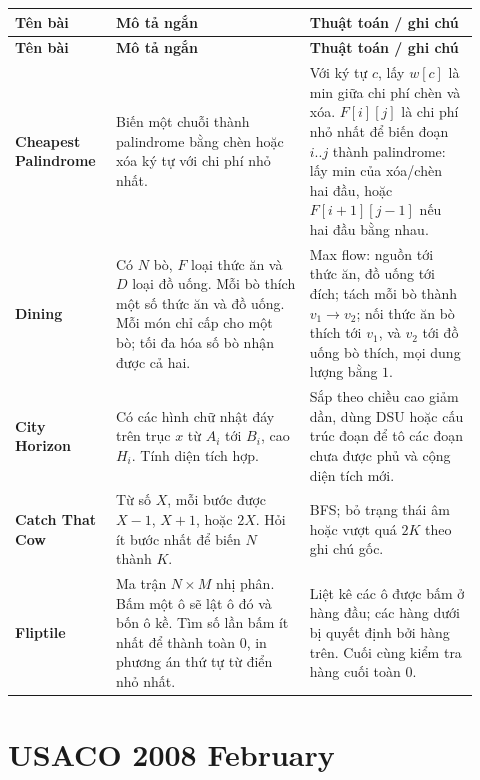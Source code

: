 \documentclass[11pt]{article}
\newenvironment{solutiontable}{%
  \small
  \setlength{\tabcolsep}{4pt}
  \renewcommand{\arraystretch}{1.14}
  \begin{longtable}{L{0.19\linewidth}L{0.39\linewidth}L{0.34\linewidth}}
  \toprule
  \textbf{Tên bài} & \textbf{Mô tả ngắn} & \textbf{Thuật toán / ghi chú}\\
  \midrule
  \endfirsthead
  \toprule
  \textbf{Tên bài} & \textbf{Mô tả ngắn} & \textbf{Thuật toán / ghi chú}\\
  \midrule
  \endhead
}{%
  \bottomrule
  \end{longtable}
  \normalsize
}
\newcommand{\problemrow}[3]{\textbf{#1} & #2 & #3\\\midrule}
\begin{document}
\begin{solutiontable}
\problemrow{Cheapest Palindrome}{Biến một chuỗi thành palindrome bằng chèn hoặc xóa ký tự với chi phí nhỏ nhất.}{Với ký tự \(c\), lấy \(w[c]\) là min giữa chi phí chèn và xóa. \(F[i][j]\) là chi phí nhỏ nhất để biến đoạn \(i..j\) thành palindrome: lấy min của xóa/chèn hai đầu, hoặc \(F[i+1][j-1]\) nếu hai đầu bằng nhau.}
\problemrow{Dining}{Có \(N\) bò, \(F\) loại thức ăn và \(D\) loại đồ uống. Mỗi bò thích một số thức ăn và đồ uống. Mỗi món chỉ cấp cho một bò; tối đa hóa số bò nhận được cả hai.}{Max flow: nguồn tới thức ăn, đồ uống tới đích; tách mỗi bò thành \(v_1\to v_2\); nối thức ăn bò thích tới \(v_1\), và \(v_2\) tới đồ uống bò thích, mọi dung lượng bằng \(1\).}
\problemrow{City Horizon}{Có các hình chữ nhật đáy trên trục \(x\) từ \(A_i\) tới \(B_i\), cao \(H_i\). Tính diện tích hợp.}{Sắp theo chiều cao giảm dần, dùng DSU hoặc cấu trúc đoạn để tô các đoạn chưa được phủ và cộng diện tích mới.}
\problemrow{Catch That Cow}{Từ số \(X\), mỗi bước được \(X-1\), \(X+1\), hoặc \(2X\). Hỏi ít bước nhất để biến \(N\) thành \(K\).}{BFS; bỏ trạng thái âm hoặc vượt quá \(2K\) theo ghi chú gốc.}
\problemrow{Fliptile}{Ma trận \(N\times M\) nhị phân. Bấm một ô sẽ lật ô đó và bốn ô kề. Tìm số lần bấm ít nhất để thành toàn \(0\), in phương án thứ tự từ điển nhỏ nhất.}{Liệt kê các ô được bấm ở hàng đầu; các hàng dưới bị quyết định bởi hàng trên. Cuối cùng kiểm tra hàng cuối toàn \(0\).}
\end{solutiontable}

\section{USACO 2008 February}
\end{document}
